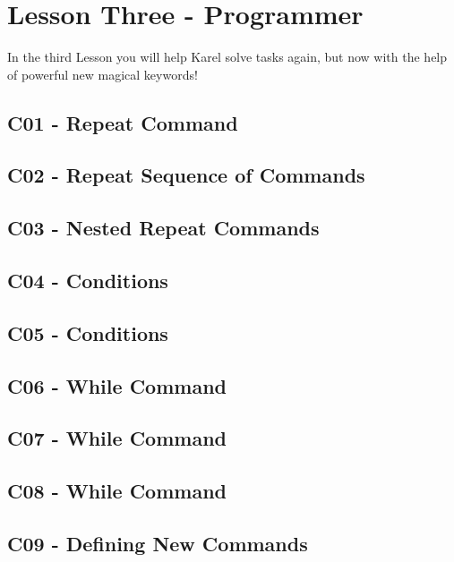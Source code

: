 \documentclass[article,A4,12pt]{llncs}
\begin{document}
\section{Lesson Three - Programmer}

In the third Lesson you will help Karel solve tasks again, but 
now with the help of powerful new magical keywords!


\subsection{C01 - Repeat Command}

\subsection{C02 - Repeat Sequence of Commands}

\subsection{C03 - Nested Repeat Commands}

\subsection{C04 - Conditions}

\subsection{C05 - Conditions}

\subsection{C06 - While Command}

\subsection{C07 - While Command}

\subsection{C08 - While Command}

\subsection{C09 - Defining New Commands}
\end{document}
